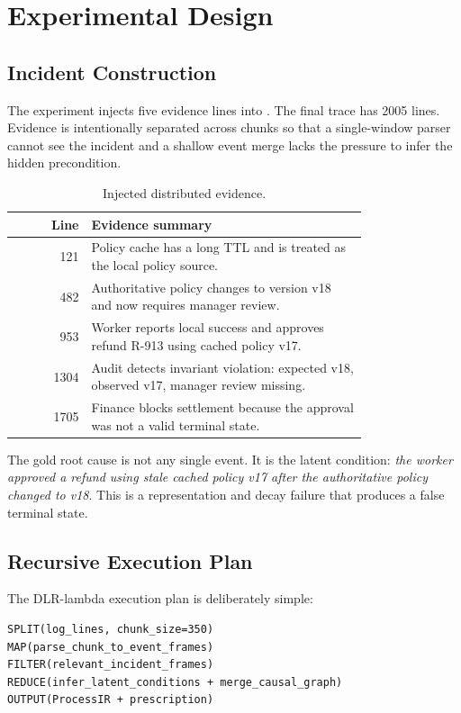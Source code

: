 \documentclass[11pt]{article}
\newcommand{\code}[1]{\texttt{\detokenize{#1}}}
\begin{document}
\section{Experimental Design}

\subsection{Incident Construction}

The experiment injects five evidence lines into \code{Linux_2k.log}. The final
trace has 2005 lines. Evidence is intentionally separated across chunks so that
a single-window parser cannot see the incident and a shallow event merge lacks
the pressure to infer the hidden precondition.

\begin{table}[h]
\centering
\caption{Injected distributed evidence.}
\small
\begin{tabular}{r p{0.78\linewidth}}
\toprule
Line & Evidence summary \\
\midrule
121 & Policy cache has a long TTL and is treated as the local policy source. \\
482 & Authoritative policy changes to version v18 and now requires manager review. \\
953 & Worker reports local success and approves refund R-913 using cached policy v17. \\
1304 & Audit detects invariant violation: expected v18, observed v17, manager review missing. \\
1705 & Finance blocks settlement because the approval was not a valid terminal state. \\
\bottomrule
\end{tabular}
\end{table}

The gold root cause is not any single event. It is the latent condition:
\emph{the worker approved a refund using stale cached policy v17 after the
authoritative policy changed to v18}. This is a representation and decay failure
that produces a false terminal state.

\subsection{Recursive Execution Plan}

The DLR-lambda execution plan is deliberately simple:

\begin{verbatim}
SPLIT(log_lines, chunk_size=350)
MAP(parse_chunk_to_event_frames)
FILTER(relevant_incident_frames)
REDUCE(infer_latent_conditions + merge_causal_graph)
OUTPUT(ProcessIR + prescription)
\end{verbatim}
\end{document}
